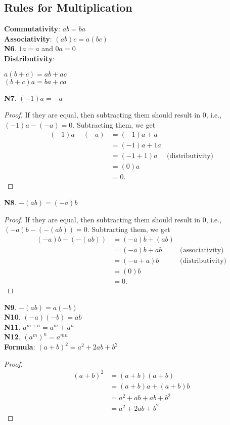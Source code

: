 \documentclass[12pt]{article}
\begin{document}
\subsection{Rules for Multiplication}
\textbf{Commutativity}: $ab=ba$ \\
\textbf{Associativity}: $(ab)c=a(bc)$ \\
\textbf{N6}. $1a=a$ and $0a=0$ \\
\textbf{Distributivity}:
\begin{center}
$a(b+c)=ab+ac$ \\
$(b+c)a=ba+ca$
\end{center}
\textbf{N7}. $(-1)a=-a$
\begin{proof}
If they are equal, then subtracting them should result in 0, i.e., $(-1)a-(-a)=0$.
Subtracting them, we get
\begin{align*}
(-1)a-(-a)&=(-1)a+a \\
&=(-1)a+1a \\
&=(-1+1)a &\text{(distributivity)} \\
&=(0)a \\
&=0.
\end{align*}
\end{proof}
\noindent \textbf{N8}. $-(ab)=(-a)b$
\begin{proof}
If they are equal, then subtracting them should result in 0, i.e., $(-a)b-(-(ab))=0$. Subtracting them, we get
\begin{align*}
(-a)b-(-(ab))&=(-a)b+(ab) \\
&=(-a)b+ab &\text{(associativity)} \\
&=(-a+a)b &\text{(distributivity)} \\
&=(0)b \\
&=0.
\end{align*}
\end{proof}
\noindent \textbf{N9}. $-(ab)=a(-b)$ \\
\textbf{N10}. $(-a)(-b)=ab$ \\
\textbf{N11}. $a^{m+n}=a^m+a^n$ \\
\textbf{N12}. $(a^m)^n=a^{mn}$ \\
\textbf{Formula}: $(a+b)^2=a^2+2ab+b^2$
\begin{proof}
\begin{align*}
(a+b)^2&=(a+b)(a+b) \\
&=(a+b)a+(a+b)b \\
&=a^2+ab+ab+b^2 \\
&=a^2+2ab+b^2
\end{align*}
\end{proof}
\end{document}
